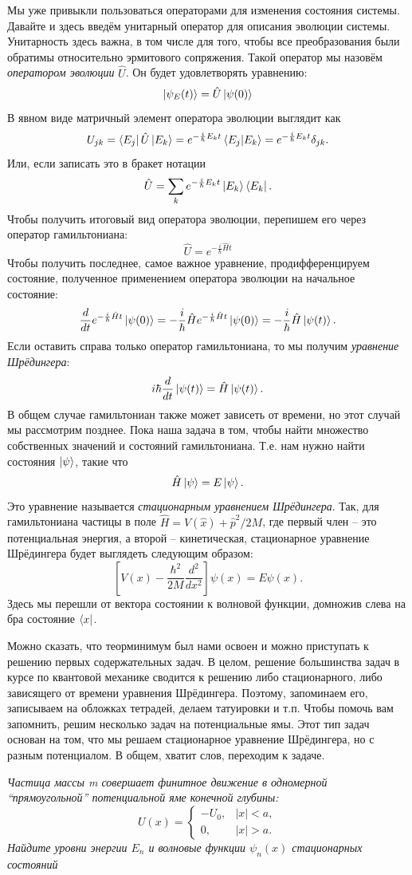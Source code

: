 Мы уже привыкли пользоваться операторами для изменения состояния системы. Давайте и здесь введём унитарный оператор для описания эволюции системы. Унитарность здесь важна, в том числе для того, чтобы все преобразования были обратимы относительно эрмитового сопряжения. Такой оператор мы назовём \textit{оператором эволюции} $\hat{U}$. Он будет удовлетворять уравнению:
\[
\ket{\psi_E(t)} = \hat{U} \ket{\psi(0)}
\]
В явном виде матричный элемент оператора эволюции выглядит как
\[
U_{jk} = \bra{E_j} \hat{U} \ket{E_k} = e^{-\frac{i}{\hbar}E_k t} \bra{E_j} \ket{E_k} = e^{-\frac{i}{\hbar} E_k t}\delta_{jk}.
\]
Или, если записать это в бракет нотации
\[
\hat{U} = \sum_{k} e^{-\frac{i}{\hbar} E_k t} \ket{E_k} \bra{E_k}.
\]
Чтобы получить итоговый вид оператора эволюции, перепишем его через оператор гамильтониана: 
\[
\hat{U} = e^{-\frac{i}{\hbar} \hat{H} t}
\]
Чтобы получить последнее, самое важное уравнение, продифференцируем состояние, полученное применением оператора эволюции на начальное состояние:
\[
\frac{d}{dt} e^{-\frac{i}{\hbar} \hat{H} t} \ket{\psi(0)} = -\frac{i}{\hbar} \hat{H} e^{-\frac{i}{\hbar} \hat{H} t} \ket{\psi(0)} = -\frac{i}{\hbar} \hat{H} \ket{\psi(t)}.
\]
Если оставить справа только оператор гамильтониана, то мы получим \textit{уравнение Шрёдингера}:
\[
i \hbar \frac{d}{dt} \ket{\psi(t)} = \hat{H} \ket{\psi(t)}.
\]
В общем случае гамильтониан также может зависеть от времени, но этот случай мы рассмотрим позднее. Пока наша задача в том, чтобы найти множество собственных значений и состояний гамильтониана. Т.е. нам нужно найти состояния $\ket{\psi}$, такие что
\[
\hat{H} \ket{\psi} = E \ket{\psi}.
\]
Это уравнение называется \textit{стационарным уравнением Шрёдингера}. Так, для гамильтониана частицы в поле $\hat{H} = V(\hat{x}) + \hat{p}^2 / 2M$, где первый член -- это потенциальная энергия, а второй -- кинетическая, стационарное уравнение Шрёдингера будет выглядеть следующим образом:
\[
\left[V(x) - \frac{\hbar^2}{2M} \frac{d^2}{dx^2}\right] \psi(x) = E \psi(x).
\]
Здесь мы перешли от вектора состоянии к волновой функции, домножив слева на бра состояние $\bra{x}$.

Можно сказать, что теорминимум был нами освоен и можно приступать к решению первых содержательных задач. В целом, решение большинства задач в курсе по квантовой механике сводится к решению либо стационарного, либо зависящего от времени уравнения Шрёдингера. Поэтому, запоминаем его, записываем на обложках тетрадей, делаем татуировки и т.п. Чтобы помочь вам запомнить, решим несколько задач на потенциальные ямы. Этот тип задач основан на том, что мы решаем стационарное уравнение Шрёдингера, но с разным потенциалом. В общем, хватит слов, переходим к задаче.
\begin{center}
    \textit{Частица массы m совершает финитное движение в одномерной ``прямоугольной'' потенциальной яме конечной глубины:}
    \[
    U(x) = 
    \begin{cases}
    -U_0,& |x| < a,\\
    0, & |x| > a.
    \end{cases}
    \]
    \textit{Найдите уровни энергии $E_n$ и волновые функции $\psi_n(x)$ стационарных состояний}
\end{center}

